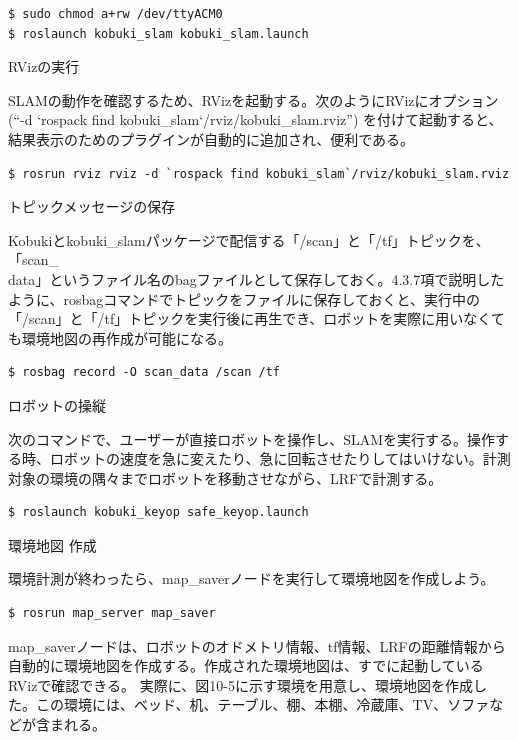 \begin{lstlisting}[language=ROS]
$ sudo chmod a+rw /dev/ttyACM0
$ roslaunch kobuki_slam kobuki_slam.launch
\end{lstlisting}

\circled{\thenum} RVizの実行

SLAMの動作を確認するため、RVizを起動する。次のようにRVizにオプション (“-d `rospack find kobuki\_slam`/rviz/kobuki\_slam.rviz”)  を付けて起動すると、結果表示のためのプラグインが自動的に追加され、便利である。

\begin{lstlisting}[language=ROS]
$ rosrun rviz rviz -d `rospack find kobuki_slam`/rviz/kobuki_slam.rviz
\end{lstlisting}

\circled{\thenum} トピックメッセージの保存

Kobukiとkobuki\_slamパッケージで配信する「/scan」と「/tf」トピックを、「scan\_\\data」というファイル名のbagファイルとして保存しておく。4.3.7項で説明したように、rosbagコマンドでトピックをファイルに保存しておくと、実行中の「/scan」と「/tf」トピックを実行後に再生でき、ロボットを実際に用いなくても環境地図の再作成が可能になる。

\begin{lstlisting}[language=ROS]
$ rosbag record -O scan_data /scan /tf
\end{lstlisting}

\circled{\thenum} ロボットの操縦

次のコマンドで、ユーザーが直接ロボットを操作し、SLAMを実行する。操作する時、ロボットの速度を急に変えたり、急に回転させたりしてはいけない。計測対象の環境の隅々までロボットを移動させながら、LRFで計測する。

\begin{lstlisting}[language=ROS]
$ roslaunch kobuki_keyop safe_keyop.launch
\end{lstlisting}

\circled{\thenum} 環境地図 作成

環境計測が終わったら、map\_saverノードを実行して環境地図を作成しよう。

\begin{lstlisting}[language=ROS]
$ rosrun map_server map_saver
\end{lstlisting}

map\_saverノードは、ロボットのオドメトリ情報、tf情報、LRFの距離情報から自動的に環境地図を作成する。作成された環境地図は、すでに起動しているRVizで確認できる。
実際に、図10-5に示す環境を用意し、環境地図を作成した。この環境には、ベッド、机、テーブル、棚、本棚、冷蔵庫、TV、ソファなどが含まれる。

